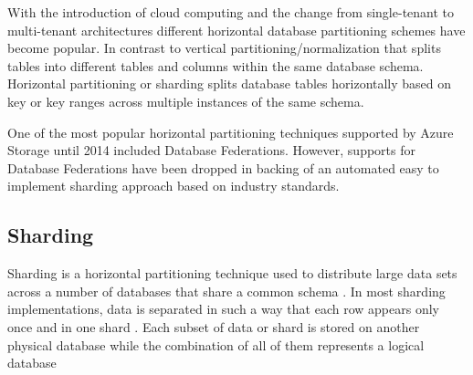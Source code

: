 With the introduction of cloud computing and the change from single-tenant to multi-tenant architectures different horizontal database partitioning schemes have become popular. In contrast to vertical partitioning/normalization that splits tables into different tables and columns within the same database schema. Horizontal partitioning or sharding splits database tables horizontally based on key or key ranges across multiple instances of the same schema.
 
One of the most popular horizontal partitioning techniques supported by Azure Storage until 2014 included Database Federations. However, supports for Database Federations have been dropped in backing of an automated easy to implement sharding approach based on industry standards.

\subsection{Sharding}

Sharding is a horizontal partitioning technique used to distribute large data sets across a number of databases that share a common schema \cite{Microsoft_Corporation_undated-ej}. In most sharding implementations, data is separated in such a way that each row appears only once and in one shard \cite{Wilder2012-so}. Each subset of data or shard is stored on another physical database while the combination of all of them represents a logical database \cite{Wilder2012-so}
 
